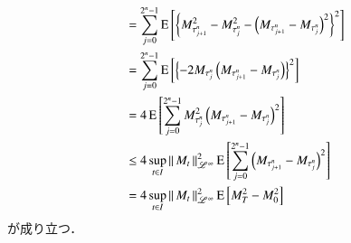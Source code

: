 \begin{prf}
\begin{align}
			&= \sum_{j=0}^{2^n-1}\operatorname{E} \left[ \left\{ M_{\tau_{j+1}^n}^2 - M_{\tau_j^n}^2 - \left( M_{\tau_{j+1}^n} - M_{\tau_j^n} \right)^2 \right\}^2 \right] \\
			&= \sum_{j=0}^{2^n-1}\operatorname{E} \left[ \left\{ -2M_{\tau_j^n} \left( M_{\tau_{j+1}^n} - M_{\tau_j^n} \right) \right\}^2 \right] \\
			&= 4 \operatorname{E} \left[  \sum_{j=0}^{2^n-1} M_{\tau_j^n}^2 \left( M_{\tau_{j+1}^n} - M_{\tau_j^n} \right)^2  \right] \\
			&\leq 4 \operatorname*{sup}_{t \in I} \left\|\, M_t\, \right\|_{\mathscr{L}^\infty}^2 \operatorname{E} \left[ \sum_{j=0}^{2^n-1} \left( M_{\tau_{j+1}^n} - M_{\tau_j^n} \right)^2  \right] \\
			&= 4 \operatorname*{sup}_{t \in I} \left\|\, M_t\, \right\|_{\mathscr{L}^\infty}^2 \operatorname{E} \left[ M_T^2 - M_0^2 \right]
		\end{align}
		が成り立つ．
		\QED
	\end{prf}
